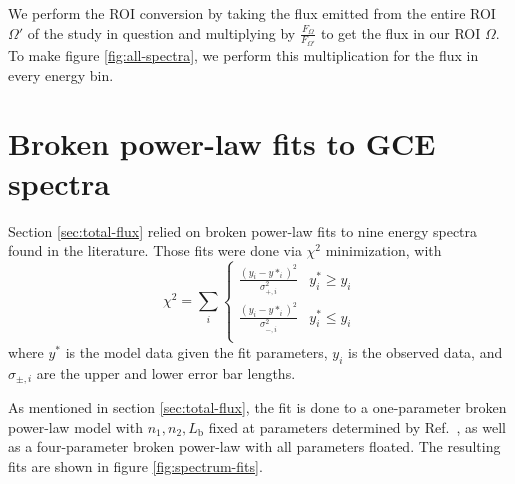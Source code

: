 \documentclass[letter,11pt]{article}
\begin{document}
We perform the ROI conversion by taking the flux emitted from the entire ROI $\Omega'$ of the study in question and multiplying by $\frac{F_\Omega}{F_{\Omega'}}$ to get the flux in our ROI $\Omega$. To make figure \ref{fig:all-spectra}, we perform this multiplication for the flux in every energy bin.







\section{Broken power-law fits to GCE spectra}
\label{app:spectra-fits}
Section \ref{sec:total-flux} relied on broken power-law fits to nine energy spectra found in the literature. Those fits were done via $\chi^2$ minimization, with
\begin{equation*}
    \chi^2 = \sum_{i} \begin{cases}
        \frac{(y_i-y*_i)^2}{\sigma_{+,i}^2} & y_i^* \geq y_i\\
        \frac{(y_i-y*_i)^2}{\sigma_{-,i}^2} & y_i^* \leq y_i\\
    \end{cases}
\end{equation*}
where $y^*$ is the model data given the fit parameters, $y_i$ is the observed data, and $\sigma_{\pm, i}$ are the upper and lower error bar lengths.

As mentioned in section \ref{sec:total-flux}, the fit is done to a one-parameter broken power-law model with $n_1, n_2, L_\text{b}$ fixed at parameters determined by Ref.~\cite{Calore:2014xka}, as well as a four-parameter broken power-law with all parameters floated.  The resulting fits are shown in figure \ref{fig:spectrum-fits}. 
\end{document}
